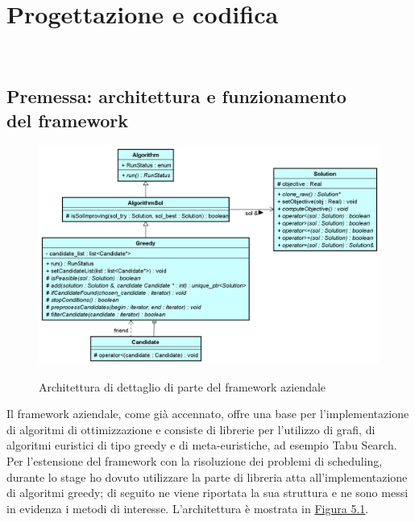 
\chapter{Progettazione e codifica}
\label{cap:progettazione-codifica}

\\

\section{Premessa: architettura e funzionamento \\ del framework}
\begin{figure}[!h]
    \begin{widepage}
        \label{fig51}
        \includegraphics[width=14.9cm,keepaspectratio]{../immagini/progettazione/framework.png}
        \caption{Architettura di dettaglio di parte del framework aziendale}
    \end{widepage}
\end{figure}
Il framework aziendale, come già accennato, offre una base per l'implementazione di algoritmi di ottimizzazione e consiste di librerie per l'utilizzo di grafi, di algoritmi euristici di tipo greedy e di meta-euristiche, ad esempio Tabu Search. 
Per l'estensione del framework con la risoluzione dei problemi di scheduling, durante lo stage ho dovuto utilizzare la parte di libreria atta all'implementazione di algoritmi greedy; di seguito ne viene riportata la sua struttura e ne sono messi in evidenza i metodi di interesse. L'architettura è mostrata in \hyperref[fig51]{Figura 5.1}.
